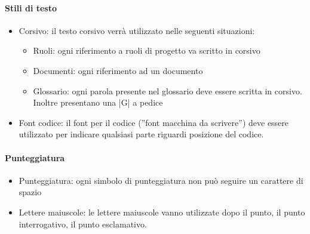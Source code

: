 \paragraph{Stili di testo}

\begin{itemize}
\item Corsivo: il testo corsivo verrà utilizzato nelle seguenti situazioni:

  \begin{itemize}
  \item  Ruoli: ogni riferimento a ruoli di progetto va scritto in corsivo
  \item  Documenti: ogni riferimento ad un documento
  \item  Glossario: ogni parola presente nel glossario deve essere scritta in corsivo. Inoltre presentano una |G| a pedice
  \end{itemize}

\item Font codice: il font per il codice (''font macchina da scrivere'') deve essere utilizzato per indicare qualsiasi parte riguardi posizione del codice.
\end{itemize}

\paragraph{Punteggiatura}

\begin{itemize}
\item  Punteggiatura: ogni simbolo di punteggiatura non può seguire un carattere di spazio

\item  Lettere maiuscole:  le lettere maiuscole vanno utilizzate dopo
  il punto, il punto interrogativo, il punto esclamativo. 
\end{itemize}

